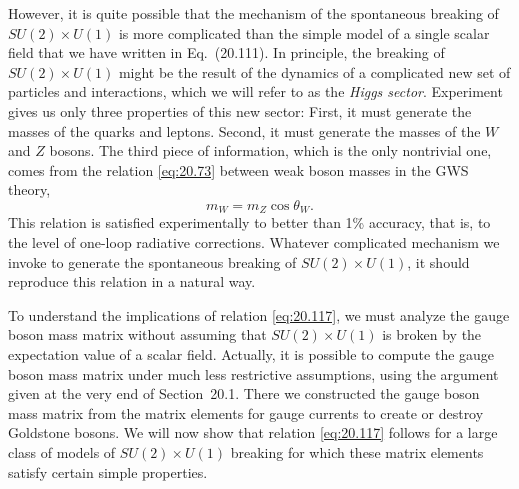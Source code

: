 However, it is quite possible that the mechanism of the spontaneous breaking
of $SU(2)\times U(1)$ is more complicated than the simple model of a single
scalar field that we have written in Eq.~(20.111).  In principle,
the breaking of $SU(2)\times U(1)$ might be the result of the dynamics of a
complicated new set of particles and interactions, which we will refer to as
the \emph{Higgs sector}.  Experiment gives us only three properties of this
new sector: First, it must generate the masses of the quarks and leptons.
Second, it must generate the masses of the $W$ and $Z$ bosons.  The third
piece of information, which is the only nontrivial one, comes from the
relation \eqref{eq:20.73} between weak boson masses in the GWS theory,
\begin{equation}
  m_W = m_Z\cos\theta_W .
  \label{eq:20.117}
\end{equation}
This relation is satisfied experimentally to better than 1\% accuracy, that
is, to the level of one-loop radiative corrections.  Whatever complicated
mechanism we invoke to generate the spontaneous breaking of $SU(2)\times U(1)$,
it should reproduce this relation in a natural way.

To understand the implications of relation \eqref{eq:20.117}, we must analyze
the gauge boson mass matrix without assuming that $SU(2)\times U(1)$ is broken
by the expectation value of a scalar field.  Actually, it is possible to
compute the gauge boson mass matrix under much less restrictive assumptions,
using the argument given at the very end of Section~20.1.  There we
constructed the gauge boson mass matrix from the matrix elements for gauge
currents to create or destroy Goldstone bosons.  We will now show that
relation \eqref{eq:20.117} follows for a large class of models of
$SU(2)\times U(1)$ breaking for which these matrix elements satisfy certain
simple properties.

